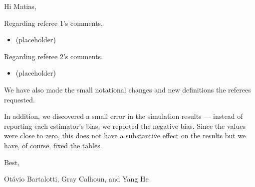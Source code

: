 \documentclass[12pt,fleqn]{article}
\begin{document}
\noindent%
Hi Matias,

\strut

Regarding referee 1's comments,
\begin{itemize}
\item (placeholder)
\end{itemize}
Regarding referee 2's comments.
\begin{itemize}
\item (placeholder)
\end{itemize}
We have also made the small notational changes and new definitions
the referees requested.

In addition, we discovered a small error in the simulation results ---
instead of reporting each estimator's bias, we reported the negative
bias. Since the values were close to zero, this does not have a
substantive effect on the results but we have, of course, fixed the
tables.

\noindent%
Best,

\noindent%
Ot\'avio Bartalotti, Gray Calhoun, and Yang He
\end{document}
